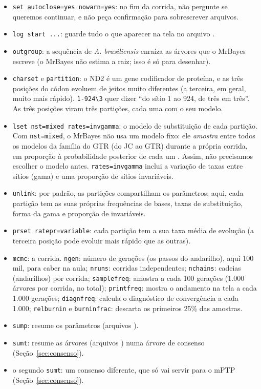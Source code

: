 \documentclass[11pt,a4paper]{article}
\newcommand{\arq}[1]{\path{#1}}
\newcommand{\cmd}[1]{\texttt{#1}}
\begin{document}
\begin{itemize}
\item \cmd{set autoclose=yes nowarn=yes}: no fim da corrida, não pergunte se queremos continuar,
e não peça confirmação para sobrescrever arquivos.
\item \cmd{log start ...}: guarde tudo o que aparecer na tela no arquivo
\arq{anolis_ND2_log.txt}.
\item \cmd{outgroup}: a sequência de \emph{A. brasiliensis} enraíza as árvores que o MrBayes
escreve (o MrBayes não estima a raiz; isso é só para desenhar).
\item \cmd{charset} e \cmd{partition}: o ND2 é um gene codificador de proteína, e as três
posições do códon evoluem de jeitos muito diferentes (a terceira, em geral, muito mais rápido).
\cmd{1-924\textbackslash 3} quer dizer ``do sítio 1 ao 924, de três em três''. As três posições
viram três partições, cada uma com o seu modelo.
\item \cmd{lset nst=mixed rates=invgamma}: o modelo de substituição de cada partição. Com
\cmd{nst=mixed}, o MrBayes não usa um modelo fixo: ele \emph{amostra} entre todos os modelos da
família do GTR (do JC ao GTR) durante a própria corrida, em proporção à probabilidade posterior
de cada um \cite{huelsenbeck2004}. Assim, não precisamos escolher o modelo antes. \cmd{rates=invgamma}
inclui a variação de taxas entre sítios (gama) e uma proporção de sítios invariáveis.
\item \cmd{unlink}: por padrão, as partições compartilham os parâmetros; aqui, cada partição tem
as suas próprias frequências de bases, taxas de substituição, forma da gama e proporção de
invariáveis.
\item \cmd{prset ratepr=variable}: cada partição tem a sua taxa média de evolução (a terceira
posição pode evoluir mais rápido que as outras).
\item \cmd{mcmc}: a corrida. \cmd{ngen}: número de gerações (os passos do andarilho), aqui
100 mil, para caber na aula; \cmd{nruns}: corridas independentes; \cmd{nchains}: cadeias
(andarilhos) por corrida; \cmd{samplefreq}: amostra a cada 100 gerações (1.000 árvores por
corrida, no total); \cmd{printfreq}: mostra o andamento na tela a cada 1.000 gerações;
\cmd{diagnfreq}: calcula o diagnóstico de convergência a cada 1.000; \cmd{relburnin} e
\cmd{burninfrac}: descarta os primeiros 25\% das amostras.
\item \cmd{sump}: resume os parâmetros (arquivos \arq{.p}).
\item \cmd{sumt}: resume as árvores (arquivos \arq{.t}) numa árvore de consenso
(Seção~\ref{sec:consenso}).
\item o segundo \cmd{sumt}: um consenso diferente, que só vai servir para o mPTP
(Seção~\ref{sec:consenso}).
\end{itemize}
\end{document}
